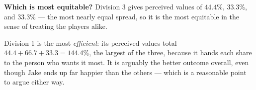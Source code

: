 \documentclass[12pt]{ximera}
\begin{document}
\begin{problem}
\begin{prompt}
\begin{feedback}
\textbf{Which is most equitable?} Division 3 gives perceived values of $44.4\%$,
$33.3\%$, and $33.3\%$ --- the most nearly equal spread, so it is the most equitable in
the sense of treating the players alike.

Division 1 is the most \emph{efficient}: its perceived values total
$44.4+66.7+33.3 = 144.4\%$, the largest of the three, because it hands each share to
the person who wants it most. It is arguably the better outcome overall, even though
Jake ends up far happier than the others --- which is a reasonable point to argue
either way.
\end{feedback}
\end{prompt}
\end{problem}
\end{document}
